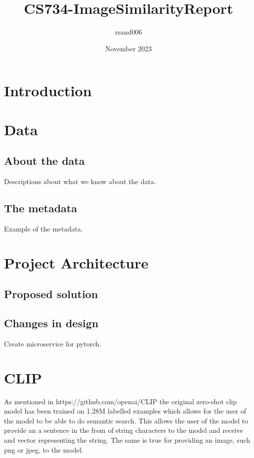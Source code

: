 \documentclass[article, 10pt]{article}
\title{CS734-ImageSimilarityReport}
\author{rsand006 }
\date{November 2023}
\begin{document}
\maketitle

\section{Introduction}

\section{Data}
\subsection{About the data}
Descriptions about what we know about the data.

\subsection{The metadata}
Example of the metadata.

\section{Project Architecture}
\subsection{Proposed solution}

\subsection{Changes in design}
Create microservice for pytorch.

\section{CLIP}
As mentioned in https://github.com/openai/CLIP the original zero-shot clip model has been trained on 1.28M labelled examples which allows for the user of the model to be able to do semantic search. This allows the user of the model to provide an a sentence in the from of string characters to the model and receive and vector representing the string. The same is true for providing an image, such png or jpeg, to the model. 
\end{document}
